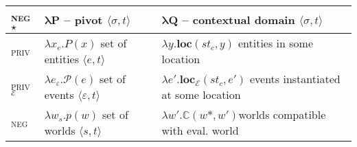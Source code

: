 \documentclass[usenames,dvipsnames]{article}
\begin{document}
	\begin{tabular}{m{.5in}m{1.5in}m{2.5in}}
		\multirow{1}{*}{{\textsc{neg}$ \star $}}&				$ \boldsymbol{\lambda P} $ -- {pivot} $ \langle\sigma,t \rangle$ & $ \boldsymbol{\lambda Q} $ -- contextual domain $\langle \sigma,t\rangle $\\\midrule\midrule
		\textsc{priv}&$ \lambda x_e.P(x) $	\newline
		set of entities $ \langle e,t\rangle $	& 
		$ \lambda y.\textbf{loc}(st_c,y) $\newline
		entities in some location\\\midrule
		\textsc{priv$ _{\mathcal E} $}&				$ \lambda e_\varepsilon.\mathcal P(e) $\newline
		set of events $ \langle\varepsilon,t\rangle  $& $ \lambda e'.\textbf{loc}_\mathcal E(st_c,e') $\newline
		events instantiated at some location\\\midrule
		\textsc{neg} & $ \lambda w_s.p(w) $	\newline
		set of worlds $ \langle s,t\rangle $&$ \lambda w'.\boldsymbol{\mathbb C}(w\!*,  w') $\newline worlds compatible with eval. world\\\bottomrule
	\end{tabular}
\end{document}

